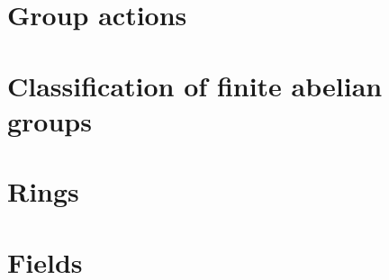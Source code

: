 \documentclass[twoside]{book}
\begin{document}
\chapter{Group actions}
\label{chapter:group-actions}


\chapter{Classification of finite abelian groups}
\label{chapter:classification-of-finite-abelian-groups}


\chapter{Rings}
\label{chapter:introduction-to-rings}



\chapter{Fields}
\label{chapter:intro-field-theory}



\backmatter
{}
\nocite{*}
\printbibliography
\end{document}
